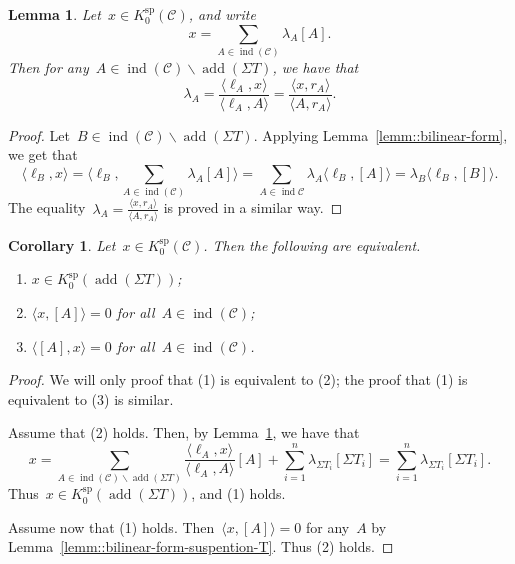 \documentclass{amsart}
\newtheorem{corollary}[theorem]{Corollary}
\newtheorem{lemma}[theorem]{Lemma}
\theoremstyle{definition}
\newcommand{\ssm}{\smallsetminus} %
\newcommand{\cat}{\mathcal{C}}
\newcommand{\susp}{\Sigma}
\newcommand{\add}{\operatorname{add}}
\newcommand{\spl}{\operatorname{sp}}
\newcommand{\Ksp}{K_0^{\spl}}
\newcommand{\ind}{\operatorname{ind}}
\begin{document}
\begin{lemma}
\label{lemm::coefficients}
 Let~$x\in \Ksp(\cat)$, and write~\[x=\sum_{A\in \ind(\cat)} \lambda_A [A].\]  Then for any~$A\in\ind(\cat) \ssm \add(\susp T)$, we have that
 \[
  \lambda_A = \frac{\langle \ell_A, x \rangle}{\langle \ell_A, A \rangle} = \frac{\langle x, r_A \rangle}{\langle A, r_A \rangle}.
 \]
\end{lemma}
\begin{proof}
 Let~$B\in \ind(\cat) \ssm \add(\susp T)$.  Applying Lemma~\ref{lemm::bilinear-form}, we get that
 \[
  \langle \ell_B, x \rangle = \langle \ell_B, \sum_{A\in \ind(\cat)} \lambda_A [A] \rangle = \sum_{A\in \ind{\cat}} \lambda_A \langle \ell_B, [A] \rangle = \lambda_B \langle \ell_B, [B] \rangle.
 \]
 The equality~$\lambda_A = \frac{\langle x, r_A \rangle}{\langle A, r_A \rangle}$ is proved in a similar way.
\end{proof}

\begin{corollary}
\label{lemm::test-susp-T}
 Let~$x\in \Ksp(\cat)$.  Then the following are equivalent.
 \begin{enumerate}
  \item $x\in \Ksp(\add(\susp T))$;
  \item $\langle x, [A]\rangle = 0$ for all~$A\in \ind(\cat)$;
  \item $\langle [A], x \rangle = 0$ for all~$A\in \ind(\cat)$.
 \end{enumerate}
\end{corollary}
\begin{proof}
 We will only proof that (1) is equivalent to (2); the proof that (1) is equivalent to (3) is similar.  
 
 Assume that (2) holds.  Then, by Lemma~\ref{lemm::coefficients}, we have that
 \[
  x = \sum_{A\in \ind(\cat) \ssm \add(\susp T)} \frac{\langle \ell_A, x \rangle}{\langle \ell_A, A \rangle}[A] + \sum_{i=1}^n \lambda_{\susp T_i} [\susp T_i] = \sum_{i=1}^n \lambda_{\susp T_i} [\susp T_i].
 \]
 Thus~$x\in \Ksp(\add(\susp T))$, and (1) holds.
 
 Assume now that (1) holds.  Then~$\langle x, [A]\rangle = 0$ for any~$A$ by Lemma~\ref{lemm::bilinear-form-suspention-T}.  Thus (2) holds.
\end{proof}
\end{document}
